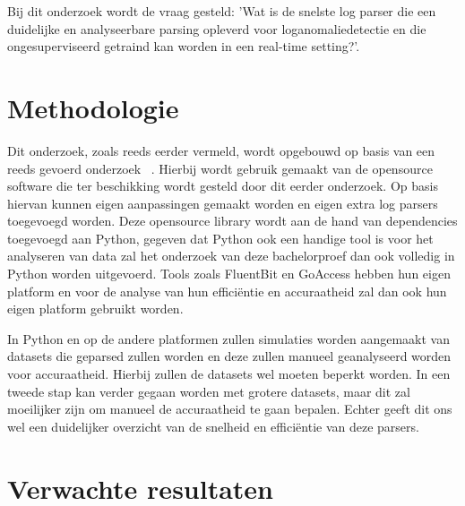 Bij dit onderzoek wordt de vraag gesteld: 'Wat is de snelste log parser die een duidelijke en analyseerbare parsing opleverd voor loganomaliedetectie en die ongesuperviseerd getraind kan worden in een real-time setting?'. 



\section{Methodologie}
\label{sec:methodologie}

Dit onderzoek, zoals reeds eerder vermeld, wordt opgebouwd op basis van een reeds gevoerd onderzoek ~\autocite{TBA2019}. Hierbij wordt gebruik gemaakt van de opensource software die ter beschikking wordt gesteld door dit eerder onderzoek. Op basis hiervan kunnen eigen aanpassingen gemaakt worden en eigen extra log parsers toegevoegd worden. Deze opensource library wordt aan de hand van dependencies toegevoegd aan Python, gegeven dat Python ook een handige tool is voor het analyseren van data zal het onderzoek van deze bachelorproef dan ook volledig in Python worden uitgevoerd. Tools zoals FluentBit en GoAccess hebben hun eigen platform en voor de analyse van hun efficiëntie en accuraatheid zal dan ook hun eigen platform gebruikt worden.

In Python en op de andere platformen zullen simulaties worden aangemaakt van datasets die geparsed zullen worden en deze zullen manueel geanalyseerd worden voor accuraatheid. Hierbij zullen de datasets wel moeten beperkt worden. In een tweede stap kan verder gegaan worden met grotere datasets, maar dit zal moeilijker zijn om manueel de accuraatheid te gaan bepalen. Echter geeft dit ons wel een duidelijker overzicht van de snelheid en efficiëntie van deze parsers.

\section{Verwachte resultaten}
\label{sec:verwachte_resultaten}

